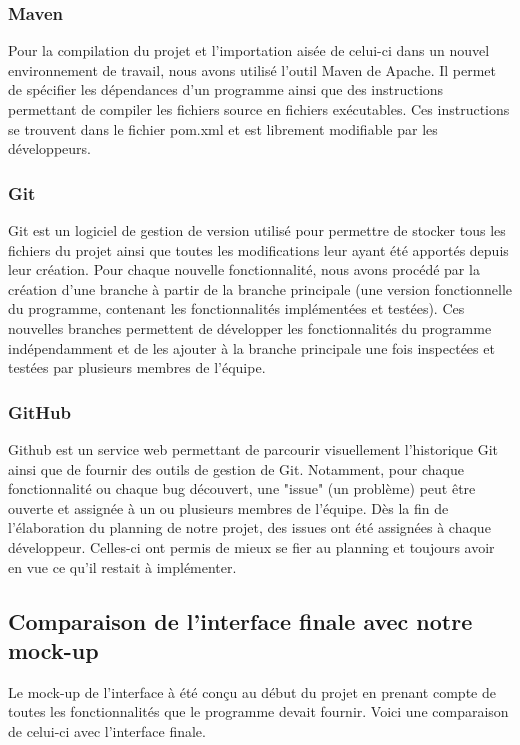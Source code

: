 \subsubsection{Maven}
Pour la compilation du projet et l'importation aisée de celui-ci dans un nouvel environnement de travail, nous avons utilisé l'outil Maven de Apache. Il permet de spécifier les dépendances d'un programme ainsi que des instructions permettant de compiler les fichiers source en fichiers exécutables. Ces instructions se trouvent dans le fichier \og pom.xml \fg{} et est librement modifiable par les développeurs.


\subsubsection{Git}
Git est un logiciel de gestion de version utilisé pour permettre de stocker tous les fichiers du projet ainsi que toutes les modifications leur ayant été apportés depuis leur création. Pour chaque nouvelle fonctionnalité, nous avons procédé par la création d'une branche à partir de la branche principale (une version fonctionnelle du programme, contenant les fonctionnalités implémentées et testées). Ces nouvelles branches permettent de développer les fonctionnalités du programme indépendamment et de les ajouter à la branche principale une fois inspectées et testées par plusieurs membres de l'équipe.

\subsubsection{GitHub}
Github est un service web permettant de parcourir visuellement l'historique Git ainsi que de fournir des outils de gestion de Git. Notamment, pour chaque fonctionnalité ou chaque bug découvert, une "issue" (un problème) peut être ouverte et assignée à un ou plusieurs membres de l'équipe. Dès la fin de l'élaboration du planning de notre projet, des issues ont été assignées à chaque développeur. Celles-ci ont permis de mieux se fier au planning et toujours avoir en vue ce qu'il restait à implémenter.

\subsection{Comparaison de l'interface finale avec notre mock-up}
Le mock-up de l'interface à été conçu au début du projet en prenant compte de toutes les fonctionnalités que le programme devait fournir. Voici une comparaison de celui-ci avec l'interface finale.

